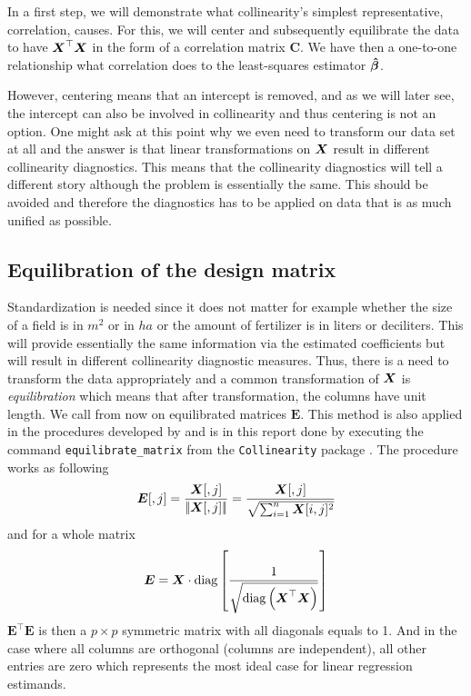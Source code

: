 \documentclass[11pt,a4paper,twoside]{book}\usepackage[]{graphicx}\usepackage[]{xcolor}
\begin{document}
In a first step, we will demonstrate what collinearity's simplest representative, correlation, causes.
For this, we will center and subsequently equilibrate the data to have ${\boldsymbol{X}}^\top {\boldsymbol{X}}$ in the form of a correlation matrix $\boldsymbol{C}$. We have then a one-to-one relationship what correlation does to the least-squares estimator ${\boldsymbol{\hat\beta}}$.

However, centering means that an intercept is removed, and as we will later see, the intercept can also be involved in collinearity and thus centering is not an option. One might ask at this point why we even need to transform our data set at all and the answer is that linear transformations on ${\boldsymbol{X}}$ result in different collinearity diagnostics. This means that the collinearity diagnostics will tell a different story although the problem is essentially the same. This should be avoided and therefore the diagnostics has to be applied on data that is as much unified as possible. 

\subsection{Equilibration of the design matrix}

Standardization is needed since it does not matter for example whether the size of a field is in $m^2$ or in $ha$ or the amount of fertilizer is in liters or deciliters. This will provide essentially the same information via the estimated coefficients but will result in different collinearity diagnostic measures. Thus, there is a need to transform the data appropriately and a common transformation of ${\boldsymbol{X}}$ is \textit{equilibration} which means that after transformation, the columns have unit length.
We call from now on equilibrated matrices $\boldsymbol{E}$. This method is also applied in the procedures developed by \cite{Belsley1991} and is in this report done by executing the command \texttt{equilibrate\_matrix} from the \texttt{Collinearity} package \citep{Collinearity}. The procedure works as following
\begin{align*}
\boldsymbol{E}[,j] = \frac{{\boldsymbol{X}}[,j]}{|\!|{\boldsymbol{X}}[,j]|\!|}=\frac{{\boldsymbol{X}}[,j]}{\sqrt{\sum_{i=1}^n {\boldsymbol{X}}[i,j]^2}}
\end{align*}
and for a whole matrix
\begin{align}
\boldsymbol{E} = {\boldsymbol{X}}\cdot\operatorname{diag}\left[\frac{1}{\sqrt{\operatorname{diag}\left({\boldsymbol{X}}^\top {\boldsymbol{X}}\right)}}\right]\label{eq:equilibration}
\end{align}
$\boldsymbol{E^\top E}$ is then a $p\times p$ symmetric matrix with all diagonals equals to 1. And in the case where all columns are orthogonal (columns are independent), all other entries are zero which represents the most ideal case for linear regression estimands.
\end{document}
